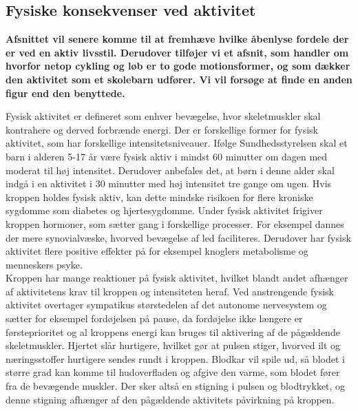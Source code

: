 \subsection{Fysiske konsekvenser ved aktivitet}
 {\color{red} \textbf{Afsnittet vil senere komme til at fremhæve hvilke åbenlyse fordele der er ved en aktiv livsstil. Derudover tilføjer vi et afsnit, som handler om hvorfor netop cykling og løb er to gode motionsformer, og som dækker den aktivitet som et skolebarn udfører.
Vi vil forsøge at finde en anden figur end den benyttede.}}


Fysisk aktivitet er defineret som enhver bevægelse, hvor skeletmuskler skal kontrahere og derved forbrænde energi. Der er forskellige former for fysisk aktivitet, som har forskellige intensitetsniveauer.\citep{Academic2016a} Ifølge Sundhedsstyrelsen skal et barn i alderen 5-17 år være fysisk aktiv i mindst 60 minutter om dagen med moderat til høj intensitet. Derudover anbefales det, at børn i denne alder skal indgå i en aktivitet i 30 minutter med høj intensitet tre gange om ugen. Hvis kroppen holdes fysisk aktiv, kan dette mindske risikoen for flere kroniske sygdomme som diabetes og hjertesygdomme. Under fysisk aktivitet frigiver kroppen hormoner, som sætter gang i forskellige processer. For eksempel dannes der mere synovialvæske, hvorved bevægelse af led faciliteres. Derudover har fysisk aktivitet flere positive effekter på for eksempel knoglers metabolisme og menneskers psyke. \citep{Academic2016a,Smith1991,Academic2016b,Cotman2007}\\
Kroppen har mange reaktioner på fysisk aktivitet, hvilket blandt andet afhænger af aktivitetens krav til kroppen og intensiteten heraf. Ved anstrengende fysisk aktivitet overtager sympatikus størstedelen af det autonome nervesystem og sætter for eksempel fordøjelsen på pause, da fordøjelse ikke længere er førsteprioritet og al kroppens energi kan bruges til aktivering af de pågældende skeletmuskler. Hjertet slår hurtigere, hvilket gør at pulsen stiger, hvorved ilt og næringsstoffer hurtigere sendes rundt i kroppen\citep{Hjerteforeningen}. Blodkar vil spile ud, så blodet i større grad kan komme til hudoverfladen og afgive den varme, som blodet fører fra de bevægende muskler. Der sker altså en stigning i pulsen og blodtrykket, og denne stigning afhænger af den pågældende aktivitets påvirkning på kroppen.\citep{Martini2012,Stanfield2013,Berchtold2010} \\

